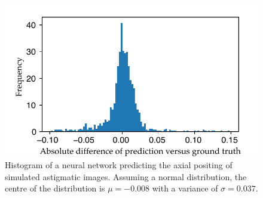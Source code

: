 \begin{figure}
    \centering
    \includegraphics{nn_cont_astig}
    \caption{
    Histogram of a neural network predicting the axial positing of simulated astigmatic images.
    Assuming a normal distribution, the centre of the distribution is \(\mu=-0.008\) with a variance of \(\sigma=0.037\).
    }\label{fig:nn_cont_astig}
\end{figure}


